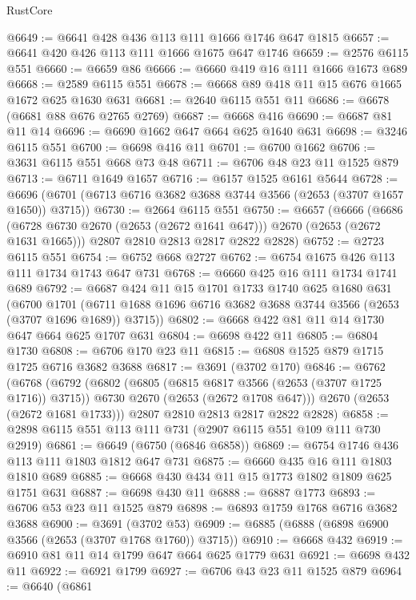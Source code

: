 \begin{lexlean}{RustCore}
\begin{coremodule}
@6649 := @6641 @428 @436 @113 @111 @1666 @1746 @647 @1815
@6657 := @6641 @420 @426 @113 @111 @1666 @1675 @647 @1746
@6659 := @2576 @6115 @551
@6660 := @6659 @86
@6666 := @6660 @419 @16 @111 @1666 @1673 @689
@6668 := @2589 @6115 @551
@6678 := @6668 @89 @418 @11 @15 @676 @1665 @1672 @625 @1630 @631
@6681 := @2640 @6115 @551 @11
@6686 := @6678 (@6681 @88 @676 @2765 @2769)
@6687 := @6668 @416
@6690 := @6687 @81 @11 @14
@6696 := @6690 @1662 @647 @664 @625 @1640 @631
@6698 := @3246 @6115 @551
@6700 := @6698 @416 @11
@6701 := @6700 @1662
@6706 := @3631 @6115 @551 @668 @73 @48
@6711 := @6706 @48 @23 @11 @1525 @879
@6713 := @6711 @1649 @1657
@6716 := @6157 @1525 @6161 @5644
@6728 := @6696 (@6701 (@6713 @6716 @3682 @3688 @3744 @3566 (@2653 (@3707 @1657 @1650)) @3715))
@6730 := @2664 @6115 @551
@6750 := @6657
    (@6666
      (@6686 (@6728 @6730 @2670 (@2653 (@2672 @1641 @647))) @2670 (@2653 (@2672 @1631 @1665)))
      @2807
      @2810
      @2813
      @2817
      @2822
      @2828)
@6752 := @2723 @6115 @551
@6754 := @6752 @668 @2727
@6762 := @6754 @1675 @426 @113 @111 @1734 @1743 @647 @731
@6768 := @6660 @425 @16 @111 @1734 @1741 @689
@6792 := @6687
    @424
    @11
    @15
    @1701
    @1733
    @1740
    @625
    @1680
    @631
    (@6700
      @1701
      (@6711 @1688 @1696 @6716 @3682 @3688 @3744 @3566 (@2653 (@3707 @1696 @1689)) @3715))
@6802 := @6668 @422 @81 @11 @14 @1730 @647 @664 @625 @1707 @631
@6804 := @6698 @422 @11
@6805 := @6804 @1730
@6808 := @6706 @170 @23 @11
@6815 := @6808 @1525 @879 @1715 @1725 @6716 @3682 @3688
@6817 := @3691 (@3702 @170)
@6846 := @6762
    (@6768
      (@6792
        (@6802
          (@6805 (@6815 @6817 @3566 (@2653 (@3707 @1725 @1716)) @3715))
          @6730
          @2670
          (@2653 (@2672 @1708 @647)))
        @2670
        (@2653 (@2672 @1681 @1733)))
      @2807
      @2810
      @2813
      @2817
      @2822
      @2828)
@6858 := @2898 @6115 @551 @113 @111 @731 (@2907 @6115 @551 @109 @111 @730 @2919)
@6861 := @6649 (@6750 (@6846 @6858))
@6869 := @6754 @1746 @436 @113 @111 @1803 @1812 @647 @731
@6875 := @6660 @435 @16 @111 @1803 @1810 @689
@6885 := @6668 @430 @434 @11 @15 @1773 @1802 @1809 @625 @1751 @631
@6887 := @6698 @430 @11
@6888 := @6887 @1773
@6893 := @6706 @53 @23 @11 @1525 @879
@6898 := @6893 @1759 @1768 @6716 @3682 @3688
@6900 := @3691 (@3702 @53)
@6909 := @6885 (@6888 (@6898 @6900 @3566 (@2653 (@3707 @1768 @1760)) @3715))
@6910 := @6668 @432
@6919 := @6910 @81 @11 @14 @1799 @647 @664 @625 @1779 @631
@6921 := @6698 @432 @11
@6922 := @6921 @1799
@6927 := @6706 @43 @23 @11 @1525 @879
@6964 := @6640
    (@6861

\end{coremodule}
\end{lexlean}
